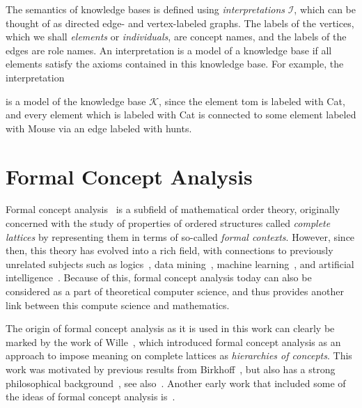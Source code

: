 The semantics of knowledge bases is defined using \emph{interpretations} $\mathcal{I}$,
which can be thought of as directed edge- and vertex-labeled graphs.  The labels of the
vertices, which we shall \emph{elements} or \emph{individuals}, are concept names, and the
labels of the edges are role names.  An interpretation is a model of a knowledge base if
all elements satisfy the axioms contained in this knowledge base.  For example, the
interpretation
\begin{center}
\end{center}
is a model of the knowledge base $\mathcal{K}$, since the element \textsf{tom} is labeled
with \textsf{Cat}, and every element which is labeled with \textsf{Cat} is connected to
some element labeled with \textsf{Mouse} via an edge labeled with \textsf{hunts}.

\section{Formal Concept Analysis}
\label{sec:learn-impl-using}

Formal concept analysis~\cite{fca-book} is a subfield of mathematical order theory,
originally concerned with the study of properties of ordered structures called
\emph{complete lattices} by representing them in terms of so-called \emph{formal
  contexts}.  However, since then, this theory has evolved into a rich field, with
connections to previously unrelated subjects such as
logics~\cite{books/math/Prediger00,conf/iccs/FerreR00}, data
mining~\cite{arules:Zaki:1998}, machine learning~\cite{conf/icfca/Kuznetsov04}, and
artificial intelligence~\cite{phd/de/Rudolph2006,Diss-Felix}.  Because of this, formal
concept analysis today can also be considered as a part of theoretical computer science,
and thus provides another link between this compute science and mathematics.

The origin of formal concept analysis as it is used in this work can clearly be marked by
the work of Wille~\cite{fca:Wille:1982}, which introduced formal concept analysis as an
approach to impose meaning on complete lattices as \emph{hierarchies of concepts}.  This
work was motivated by previous results from Birkhoff~\cite{books/math/Birkhoff67}, but
also has a strong philosophical background~\cite{books/phil/Hentig72}, see
also~\cite{Wille:Begriffsdenken}.  Another early work that included some of the ideas of
formal concept analysis is~\cite{OrdreEtClassification}.

